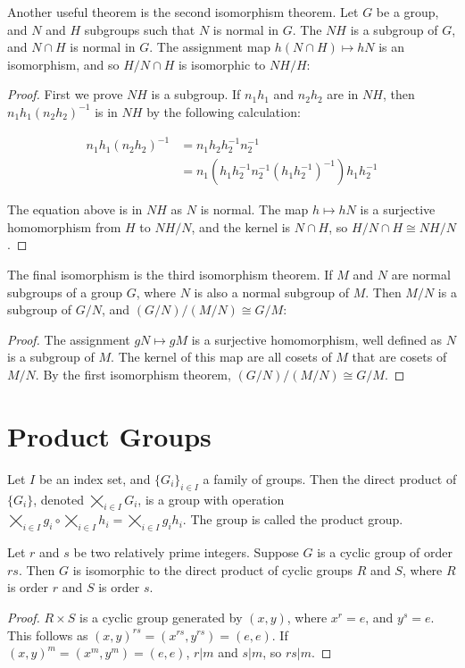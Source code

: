 \documentclass{report}
\begin{document}
Another useful theorem is the second isomorphism theorem. Let $G$ be a group, and $N$ and $H$ subgroups such that $N$ is normal in $G$. The $NH$ is a subgroup of $G$, and $N \cap H$ is normal in $G$. The assignment map $h(N \cap H) \mapsto hN$ is an isomorphism, and so $H/N \cap H$ is isomorphic to $NH/H$:
\begin{proof}
    First we prove $NH$ is a subgroup. If $n_1h_1$ and $n_2h_2$ are in $NH$, then $n_1h_1(n_2h_2)^{-1}$ is in $NH$ by the following calculation:

    \begin{align*}
    n_1h_1(n_2h_2)^{-1} &= n_1h_2h_2^{-1}n_2^{-1}\\
    &= n_1(h_1h_2^{-1}n_2^{-1}(h_1h_2^{-1})^{-1})h_1h_2^{-1}
    \end{align*}

    The equation above is in $NH$ as $N$ is normal. The map $h \mapsto hN$ is a surjective homomorphism from $H$ to $NH/N$, and the kernel is $N \cap H$, so $H/N \cap H \cong NH/N$.
\end{proof}

The final isomorphism is the third isomorphism theorem. If $M$ and $N$ are normal subgroups of a group $G$, where $N$ is also a normal subgroup of $M$. Then $M/N$ is a subgroup of $G/N$, and $(G/N)/(M/N) \cong G/M$:
\begin{proof}
    The assignment $gN \mapsto gM$ is a surjective homomorphism, well defined as $N$ is a subgroup of $M$. The kernel of this map are all cosets of $M$ that are cosets of $M/N$. By the first isomorphism theorem, $(G/N)/(M/N) \cong G/M$.
\end{proof}

\section{Product Groups}

Let $I$ be an index set, and $\{ G_i \}_{i \in I}$ a family of groups. Then the direct product of $\{ G_i \}$, denoted $\varprod_{i \in I} G_i$, is a group with operation $\varprod_{i \in I} g_i \circ \varprod_{i \in I} h_i = \varprod_{i \in I} g_ih_i$. The group is called the product group.

Let $r$ and $s$ be two relatively prime integers. Suppose $G$ is a cyclic group of order $rs$. Then $G$ is isomorphic to the direct product of cyclic groups $R$ and $S$, where $R$ is order $r$ and $S$ is order $s$.
\begin{proof}
    $R \times S$ is a cyclic group generated by $(x,y)$, where $x^r = e$, and $y^s = e$. This follows as $(x,y)^{rs} = (x^{rs},y^{rs}) = (e,e)$. If $(x,y)^m = (x^m,y^m) = (e,e)$, $r|m$ and $s|m$, so $rs|m$.
\end{proof}
\end{document}
